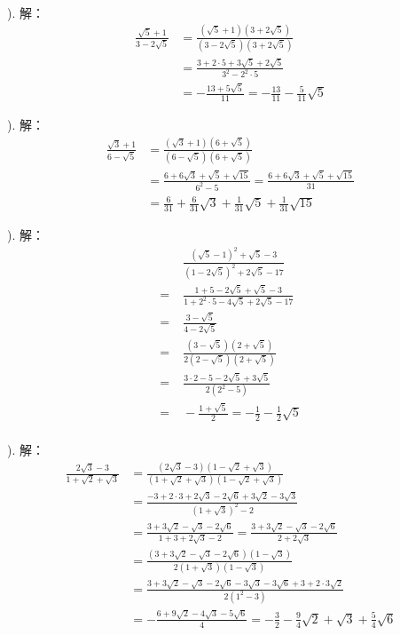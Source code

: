 \documentclass[12pt,UTF8]{ctexbook}
\begin{document}
\begin{so}
    \mbox{} \\
    ). 解：
    \begin{align*}
        \frac{\sqrt{5} + 1}{3 - 2\sqrt{5}} & = \frac{(\sqrt{5} + 1)(3 + 2\sqrt{5})}{(3 - 2\sqrt{5})(3 + 2\sqrt{5})} \\
        &= \frac{3 + 2\cdot 5 + 3\sqrt{5} + 2\sqrt{5}}{3^2 - 2^2\cdot 5} \\
        &= -\frac{13 + 5\sqrt{5}}{11} = -\frac{13}{11} - \frac{5}{11}\sqrt{5}
    \end{align*}
    
    ).  解：
    \begin{align*}
        \frac{\sqrt{3} + 1}{6 - \sqrt{5}} &= \frac{(\sqrt{3} + 1)(6 + \sqrt{5})}{(6 - \sqrt{5})(6 + \sqrt{5})} \\
        &= \frac{6 + 6\sqrt{3} + \sqrt{5} + \sqrt{15}}{6^2 - 5} = \frac{6 + 6\sqrt{3} + \sqrt{5} + \sqrt{15}}{31} \\
        &= \frac{6}{31} + \frac{6}{31}\sqrt{3} + \frac{1}{31}\sqrt{5} + \frac{1}{31}\sqrt{15}
    \end{align*}

    ).  解：
    \begin{align*}
        &\; \frac{(\sqrt{5} - 1)^2 + \sqrt{5} - 3}{(1 - 2\sqrt{5})^2 + 2\sqrt{5} - 17} \\
        =&\; \frac{1 + 5 - 2\sqrt{5} + \sqrt{5} - 3}{1 + 2^2\cdot 5 - 4\sqrt{5} + 2\sqrt{5} - 17} \\
        =&\; \frac{3 - \sqrt{5}}{4 - 2\sqrt{5}} \\
        =&\; \frac{(3 - \sqrt{5})(2 + \sqrt{5})}{2(2 - \sqrt{5})(2 + \sqrt{5})} \\
        =&\; \frac{3\cdot 2 - 5 - 2\sqrt{5} + 3\sqrt{5}}{2(2^2 - 5)} \\
        =&\; -\frac{1 + \sqrt{5}}{2} = -\frac{1}{2} - \frac{1}{2}\sqrt{5}\\
    \end{align*}

    ). 解：
    \begin{align*}
        \frac{2\sqrt{3} - 3}{1 + \sqrt{2} + \sqrt{3}} &= \frac{(2\sqrt{3} - 3)(1 - \sqrt{2} + \sqrt{3})}{(1 + \sqrt{2} + \sqrt{3})(1 - \sqrt{2} + \sqrt{3})} \\
        &= \frac{-3 + 2 \cdot 3 + 2\sqrt{3} - 2\sqrt{6} + 3\sqrt{2} - 3\sqrt{3}}{(1 + \sqrt{3})^2 - 2} \\
        &= \frac{3 + 3\sqrt{2} - \sqrt{3} - 2\sqrt{6}}{1 + 3 + 2\sqrt{3} - 2} = \frac{3 + 3\sqrt{2} - \sqrt{3} - 2\sqrt{6}}{2 + 2\sqrt{3}} \\
        &= \frac{(3 + 3\sqrt{2} - \sqrt{3} - 2\sqrt{6})(1 - \sqrt{3})}{2(1 + \sqrt{3})(1 - \sqrt{3})} \\
        &= \frac{3 + 3\sqrt{2} - \sqrt{3} - 2\sqrt{6} - 3\sqrt{3} - 3\sqrt{6} + 3 + 2\cdot 3\sqrt{2}}{2(1^2 - 3)} \\
        &= -\frac{6 + 9\sqrt{2} - 4\sqrt{3} - 5\sqrt{6}}{4} = -\frac{3}{2} - \frac{9}{4}\sqrt{2} + \sqrt{3} + \frac{5}{4}\sqrt{6}\\
    \end{align*}
\end{so}
\end{document}
